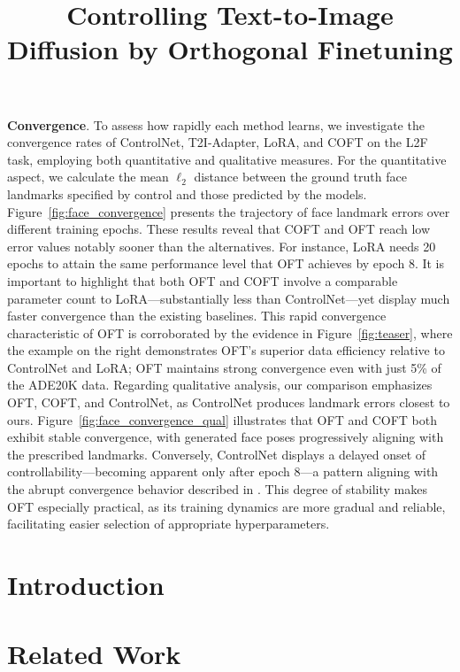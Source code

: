 \title{Controlling Text-to-Image Diffusion by Orthogonal Finetuning}
\textbf{Convergence}. To assess how rapidly each method learns, we investigate the convergence rates of ControlNet, T2I-Adapter, LoRA, and COFT on the L2F task, employing both quantitative and qualitative measures. For the quantitative aspect, we calculate the mean $\ell_2$ distance between the ground truth face landmarks specified by control and those predicted by the models. Figure~\ref{fig:face_convergence} presents the trajectory of face landmark errors over different training epochs. These results reveal that COFT and OFT reach low error values notably sooner than the alternatives. For instance, LoRA needs 20 epochs to attain the same performance level that OFT achieves by epoch 8. It is important to highlight that both OFT and COFT involve a comparable parameter count to LoRA—substantially less than ControlNet—yet display much faster convergence than the existing baselines. This rapid convergence characteristic of OFT is corroborated by the evidence in Figure~\ref{fig:teaser}, where the example on the right demonstrates OFT's superior data efficiency relative to ControlNet and LoRA; OFT maintains strong convergence even with just 5\% of the ADE20K data. Regarding qualitative analysis, our comparison emphasizes OFT, COFT, and ControlNet, as ControlNet produces landmark errors closest to ours. Figure~\ref{fig:face_convergence_qual} illustrates that OFT and COFT both exhibit stable convergence, with generated face poses progressively aligning with the prescribed landmarks. Conversely, ControlNet displays a delayed onset of controllability—becoming apparent only after epoch 8—a pattern aligning with the abrupt convergence behavior described in \cite{zhang2023adding}. This degree of stability makes OFT especially practical, as its training dynamics are more gradual and reliable, facilitating easier selection of appropriate hyperparameters.

\section{Introduction}

\section{Related Work}

